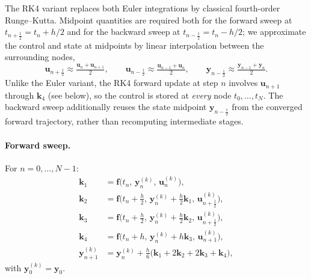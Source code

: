 \documentclass[a4paper, 10pt]{article}
\begin{document}
The RK4 variant replaces both Euler integrations by classical fourth-order
Runge--Kutta. Midpoint quantities are required both for the forward sweep
at $t_{n+\tfrac12} = t_n + h/2$ and for the backward sweep at
$t_{n-\tfrac12} = t_n - h/2$; we approximate the control and state at
midpoints by linear interpolation between the surrounding nodes,
\begin{equation}
    \bm{u}_{n+\tfrac12} \approx \tfrac{\bm{u}_n + \bm{u}_{n+1}}{2},
    \qquad
    \bm{u}_{n-\tfrac12} \approx \tfrac{\bm{u}_{n-1} + \bm{u}_n}{2},
    \qquad
    \bm{y}_{n-\tfrac12} \approx \tfrac{\bm{y}_{n-1} + \bm{y}_n}{2}.
    \label{eq:fb-rk4-mid}
\end{equation}
Unlike the Euler variant, the RK4 forward update at step $n$ involves
$\bm{u}_{n+1}$ through $\bm{k}_4$ (see below), so the control is stored at
\emph{every} node $t_0,\dots,t_N$. The backward sweep additionally reuses
the state midpoint $\bm{y}_{n-\tfrac12}$ from the converged forward
trajectory, rather than recomputing intermediate stages.

\paragraph{Forward sweep.} For $n = 0,\dots,N-1$:
\begin{align}
    \bm{k}_1 &= \bm{f}\bigl(t_n,\,\bm{y}_n^{(k)},\,\bm{u}_n^{(k)}\bigr), \\
    \bm{k}_2 &= \bm{f}\bigl(t_n + \tfrac{h}{2},\,\bm{y}_n^{(k)} + \tfrac{h}{2}\bm{k}_1,\,\bm{u}_{n+\tfrac12}^{(k)}\bigr), \\
    \bm{k}_3 &= \bm{f}\bigl(t_n + \tfrac{h}{2},\,\bm{y}_n^{(k)} + \tfrac{h}{2}\bm{k}_2,\,\bm{u}_{n+\tfrac12}^{(k)}\bigr), \\
    \bm{k}_4 &= \bm{f}\bigl(t_n + h,\,\bm{y}_n^{(k)} + h\bm{k}_3,\,\bm{u}_{n+1}^{(k)}\bigr), \\
    \bm{y}_{n+1}^{(k)} &= \bm{y}_n^{(k)} + \tfrac{h}{6}\bigl(\bm{k}_1 + 2\bm{k}_2 + 2\bm{k}_3 + \bm{k}_4\bigr),
    \label{eq:fb-rk4-fwd}
\end{align}
with $\bm{y}_0^{(k)} = \bm{y}_0$.
\end{document}
